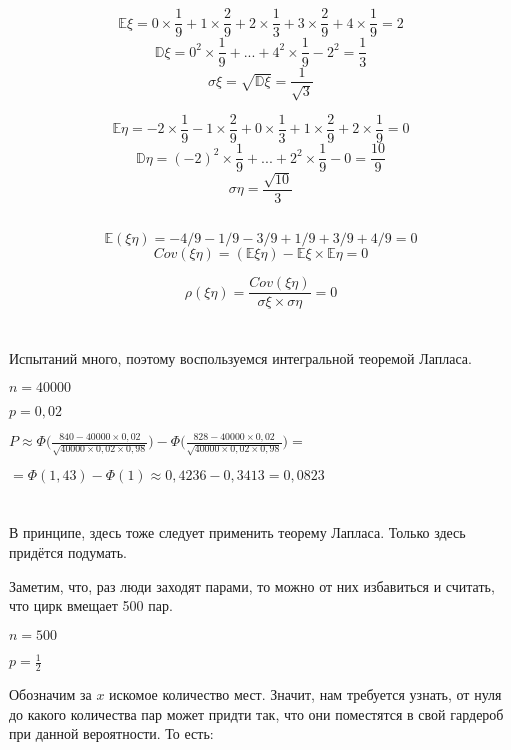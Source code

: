 \documentclass[a4paper,10pt]{article}
\begin{document}
\subsection{}
$$
\mathbb{E}\xi = 0 \times \frac{1}{9} + 1 \times \frac{2}{9} + 2 \times \frac{1}{3}
+ 3 \times \frac{2}{9} + 4 \times \frac{1}{9} = 2
$$
$$
\mathbb{D}\xi = 0^2 \times \frac{1}{9} + ... + 4^2 \times \frac{1}{9} - 2^2 = \frac{1}{3}
$$
$$\sigma\xi = \sqrt{\mathbb{D}\xi} = \frac{1}{\sqrt{3}}$$

$$
\mathbb{E}\eta = -2 \times \frac{1}{9} - 1 \times \frac{2}{9} + 0 \times \frac{1}{3}
+ 1 \times \frac{2}{9} + 2 \times \frac{1}{9} = 0
$$
$$
\mathbb{D}\eta = (-2)^2 \times \frac{1}{9} + ... + 2^2 \times \frac{1}{9} - 0 = \frac{10}{9}
$$
$$\sigma\eta = \frac{\sqrt{10}}{3}$$

\subsection{}
$$ \mathbb{E}(\xi\eta) = -4/9 - 1/9 - 3/9 + 1/9 + 3/9 + 4/9 = 0 $$
$$ Cov(\xi\eta) = (\mathbb{E}\xi\eta) - \mathbb{E}\xi \times \mathbb{E}\eta = 0 $$

$$ \rho(\xi\eta) = \frac{Cov(\xi\eta)}{\sigma\xi \times \sigma\eta} = 0 $$

\section{}
Испытаний много, поэтому воспользуемся интегральной теоремой Лапласа.

$n = 40 000$

$p = 0,02$

$P \approx \Phi\Bigg(\frac{840 - 40 000 \times 0,02}{\sqrt{40 000 \times 0,02 \times 0,98}}\Bigg) - \Phi\Bigg(\frac{828 - 40 000 \times 0,02}{\sqrt{40 000 \times 0,02 \times 0,98}}\Bigg) = $

$= \Phi(1,43) - \Phi(1) \approx 0,4236 - 0,3413 = 0,0823$

\section{}
В принципе, здесь тоже следует применить теорему Лапласа. Только здесь придётся подумать.

Заметим, что, раз люди заходят парами, то можно от них избавиться и считать,
что цирк вмещает 500 пар.

$n = 500$

$p = \frac{1}{2}$

Обозначим за $x$ искомое количество мест. Значит, нам требуется узнать, от нуля до какого количества
пар может придти так, что они поместятся в свой гардероб при данной вероятности. То есть:
\end{document}
